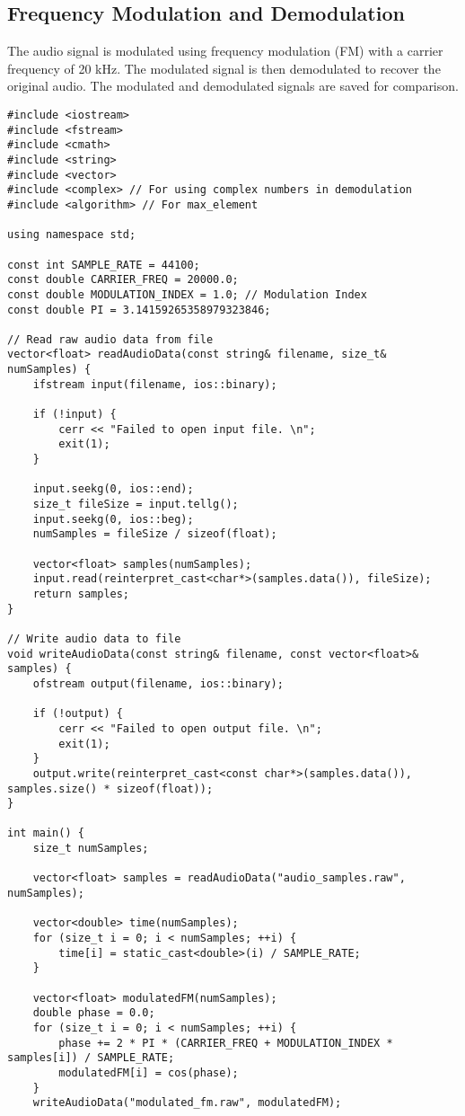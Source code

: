 \documentclass{article}
\begin{document}
\subsection{Frequency Modulation and Demodulation}
The audio signal is modulated using frequency modulation (FM) with a carrier frequency of 20 kHz. The modulated signal is then demodulated to recover the original audio. The modulated and demodulated signals are saved for comparison.

\begin{verbatim}
#include <iostream>
#include <fstream>
#include <cmath>
#include <string>
#include <vector>
#include <complex> // For using complex numbers in demodulation
#include <algorithm> // For max_element

using namespace std;

const int SAMPLE_RATE = 44100;
const double CARRIER_FREQ = 20000.0;
const double MODULATION_INDEX = 1.0; // Modulation Index
const double PI = 3.14159265358979323846;

// Read raw audio data from file
vector<float> readAudioData(const string& filename, size_t& numSamples) {
    ifstream input(filename, ios::binary);

    if (!input) {
        cerr << "Failed to open input file. \n";
        exit(1);
    }

    input.seekg(0, ios::end);
    size_t fileSize = input.tellg();
    input.seekg(0, ios::beg);
    numSamples = fileSize / sizeof(float);

    vector<float> samples(numSamples);
    input.read(reinterpret_cast<char*>(samples.data()), fileSize);
    return samples;
}

// Write audio data to file
void writeAudioData(const string& filename, const vector<float>& samples) {
    ofstream output(filename, ios::binary);

    if (!output) {
        cerr << "Failed to open output file. \n";
        exit(1);
    }
    output.write(reinterpret_cast<const char*>(samples.data()), samples.size() * sizeof(float));
}

int main() {
    size_t numSamples;

    vector<float> samples = readAudioData("audio_samples.raw", numSamples);

    vector<double> time(numSamples);
    for (size_t i = 0; i < numSamples; ++i) {
        time[i] = static_cast<double>(i) / SAMPLE_RATE;
    }

    vector<float> modulatedFM(numSamples);
    double phase = 0.0;
    for (size_t i = 0; i < numSamples; ++i) {
        phase += 2 * PI * (CARRIER_FREQ + MODULATION_INDEX * samples[i]) / SAMPLE_RATE;
        modulatedFM[i] = cos(phase);
    }
    writeAudioData("modulated_fm.raw", modulatedFM);


\end{verbatim}
\end{document}
